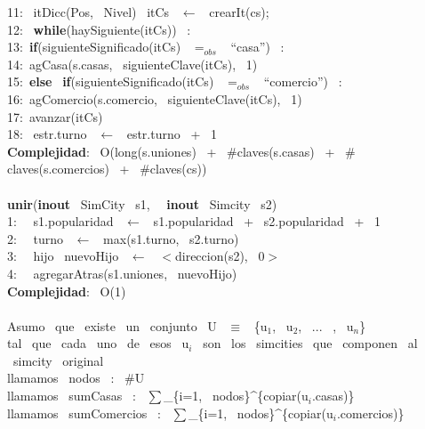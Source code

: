 \begin{Algoritmos}
    11: \ itDicc(Pos, \ Nivel) \ itCs \ $\leftarrow$ \ crearIt(cs);\\
    12: \ \textbf{while}(haySiguiente(itCs)) \ :\\
    13:\indent  \ \textbf{if}(siguienteSignificado(itCs) \ $=_{obs}$ \ ``casa'') \ :\\
    14:\indent \indent  \ agCasa(s.casas, \ siguienteClave(itCs), \ 1)\\
    15:\indent  \ \textbf{else} \ \textbf{if}(siguienteSignificado(itCs) \ $=_{obs}$ \ ``comercio'') \ :\\
    16:\indent \indent  \ agComercio(s.comercio, \ siguienteClave(itCs), \ 1)\\
    17:\indent  \ avanzar(itCs)\\
    18: \ estr.turno \ $\longleftarrow$ \ estr.turno \ + \ 1 \ \\
    \textbf{Complejidad}: \ O(long(s.uniones) \ + \ $ \# $claves(s.casas) \ + \ $ \# $claves(s.comercios) \ + \ $ \# $claves(cs))\\
    \noindent\makebox[\linewidth]{\rule{\textwidth}{0.4pt}}
    \\
    \noindent\makebox[\linewidth]{\rule{\textwidth}{0.4pt}}
    \textbf{unir}(\textbf{inout} \ SimCity \ s1, \  \ \textbf{inout} \ Simcity \ s2)\\
    1: \  \ s1.popularidad \ $\leftarrow$ \ s1.popularidad \ + \ s2.popularidad \ + \ 1\\
    2: \  \ turno \ $\leftarrow$ \ max(s1.turno, \ s2.turno)\\
    3: \  \ hijo \ nuevoHijo \ $\leftarrow$ \ $<$direccion(s2), \ 0$>$\\
    4: \  \ agregarAtras(s1.uniones, \ nuevoHijo)\\
    \textbf{Complejidad}: \ O(1)\\
    \noindent\makebox[\linewidth]{\rule{\textwidth}{0.4pt}}
    \pagebreak\\
    Asumo \ que \ existe \ un \ conjunto \ U \ $\equiv$ \ \{u$_1$, \ u$_2$, \ ... \ , \ u$_n$\}\\
    tal \ que \ cada \ uno \ de \ esos \ u$_i$ \ son \ los \ simcities \ que \ componen \ al \ simcity \ original\\
    llamamos \ nodos \ : \ $ \# $U\\
    llamamos \ sumCasas \ : \ $\sum$\_\{i=1, \ nodos\}\^{}\{copiar(u$_i$.casas)\}\\
    llamamos \ sumComercios \ : \ $\sum$\_\{i=1, \ nodos\}\^{}\{copiar(u$_i$.comercios)\}\\

\end{Algoritmos}
